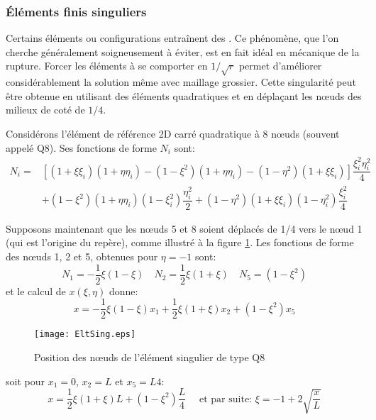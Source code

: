 \medskip
\subsubsection{Éléments finis singuliers}
Certains éléments ou configurations entraînent des .
Ce phénomène, que l'on cherche généralement soigneusement à éviter, est en fait idéal en
mécanique de la rupture.
Forcer les éléments à se comporter en $1/\sqrt{r}$ permet d'améliorer considérablement la solution
même avec maillage grossier.
Cette singularité peut être obtenue en utilisant des éléments quadratiques et en déplaçant
les nœuds des milieux de coté de $1/4$.

\medskip
Considérons l'élément de référence 2D carré quadratique à 8 nœuds (souvent appelé Q8).
Ses fonctions de forme $N_i$ sont:
\begin{equation} \begin{array}{ll}
N_i = &\left[ (1+\xi\xi_i)(1+\eta\eta_i)-(1-\xi^2)(1+\eta\eta_i)-(1-\eta^2)(1+\xi\xi_i)\right]
\dfrac{\xi_i^2\eta_i^2}4 \\
& +
(1-\xi^2)(1+\eta\eta_i)(1-\xi_i^2)\dfrac{\eta_i^2}2  +
(1-\eta^2)(1+\xi\xi_i)(1-\eta_i^2)\dfrac{\xi_i^2}4
\end{array}\end{equation}

Supposons maintenant que les nœuds 5 et 8 soient déplacés de 1/4 vers le nœud 1 (qui est l'origine
du repère), comme illustré à la figure \ref{fig-EltSing}.
Les fonctions de forme des nœuds 1, 2 et 5, obtenues pour $\eta=-1$ sont:
\begin{equation} N_1= -\frac12\xi(1-\xi) \quad
  N_2 = \frac12\xi(1+\xi) \quad
  N_5 = (1-\xi^2)
\end{equation}
et le calcul de $x(\xi,\eta)$ donne:
\begin{equation} x = -\frac12\xi(1-\xi)x_1 + \frac12\xi(1+\xi)x_2 + (1-\xi^2)x_5 \end{equation}
\begin{figure}[ht]\centering
\texttt{[image: EltSing.eps]}
\caption{Position des nœuds de l'élément singulier de type Q8}\label{fig-EltSing}
\end{figure}
soit pour $x_1=0$, $x_2=L$ et $x_5=L4$:
\begin{equation} x = \frac12\xi(1+\xi)L + (1-\xi^2)\frac{L}4 \quad \text{ et par suite: }
\xi=-1+2\sqrt{\frac{x}L} \end{equation}

